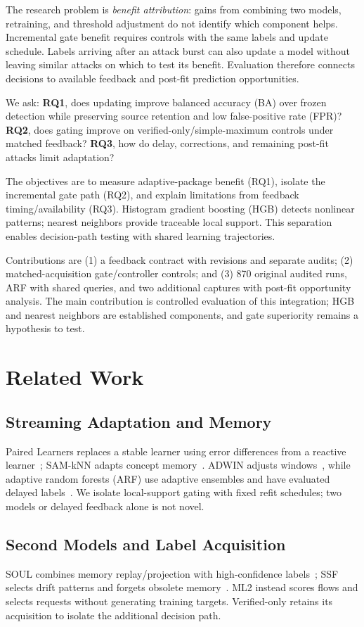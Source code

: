 \documentclass[conference]{IEEEtran}
\begin{document}
The research problem is \emph{benefit attribution}: gains from combining two models, retraining, and threshold adjustment do not identify which component helps. Incremental gate benefit requires controls with the same labels and update schedule. Labels arriving after an attack burst can also update a model without leaving similar attacks on which to test its benefit. Evaluation therefore connects decisions to available feedback and post-fit prediction opportunities.

We ask: \textbf{RQ1}, does updating improve balanced accuracy (BA) over frozen detection while preserving source retention and low false-positive rate (FPR)? \textbf{RQ2}, does gating improve on verified-only/simple-maximum controls under matched feedback? \textbf{RQ3}, how do delay, corrections, and remaining post-fit attacks limit adaptation?

The objectives are to measure adaptive-package benefit (RQ1), isolate the incremental gate path (RQ2), and explain limitations from feedback timing/availability (RQ3). Histogram gradient boosting (HGB) detects nonlinear patterns; nearest neighbors provide traceable local support. This separation enables decision-path testing with shared learning trajectories.

Contributions are (1) a feedback contract with revisions and separate audits; (2) matched-acquisition gate/controller controls; and (3) 870 original audited runs, ARF with shared queries, and two additional captures with post-fit opportunity analysis. The main contribution is controlled evaluation of this integration; HGB and nearest neighbors are established components, and gate superiority remains a hypothesis to test.

\section{Related Work}
\subsection{Streaming Adaptation and Memory}
Paired Learners replaces a stable learner using error differences from a reactive learner~\cite{paired}; SAM-kNN adapts concept memory~\cite{sam}. ADWIN adjusts windows~\cite{adwin}, while adaptive random forests (ARF) use adaptive ensembles and have evaluated delayed labels~\cite{arf}. We isolate local-support gating with fixed refit schedules; two models or delayed feedback alone is not novel.

\subsection{Second Models and Label Acquisition}
SOUL combines memory replay/projection with high-confidence labels~\cite{soul}; SSF selects drift patterns and forgets obsolete memory~\cite{ssf}. ML2 instead scores flows and selects requests without generating training targets. Verified-only retains its acquisition to isolate the additional decision path.
\end{document}
